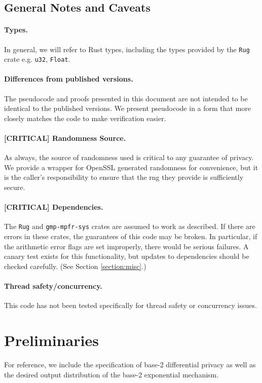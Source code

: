\documentclass[11pt]{article}
\theoremstyle{definition}
\newcommand{\unsigned}[1]{{\tt u#1}}
\begin{document}
\subsection{General Notes and Caveats}
\paragraph{Types.} In general, we will refer to Rust types, including the types provided by the {\tt Rug} crate e.g. \unsigned{32}, {\tt Float}.

\paragraph{Differences from published versions.} The pseudocode and proofs presented in this document are not intended to be identical to the published versions. We present pseudocode in a form that more closely matches the code to make verification easier.

\paragraph{[CRITICAL] Randomness Source.} As always, the source of randomness used is critical to any guarantee of privacy. We provide a wrapper for OpenSSL generated randomness for convenience, but it is the caller's responsibility to ensure that the rng they provide is sufficiently secure. 

\paragraph{[CRITICAL] Dependencies.} The {\tt Rug} and {\tt gmp-mpfr-sys} crates are assumed to work as described. If there are errors in these crates, the guarantees of this code may be broken. In particular, if the arithmetic error flags are set improperly, there would be serious failures. A canary test exists for this functionality, but updates to dependencies should be checked carefully. (See Section \ref{section:misc}.)

\paragraph{Thread safety/concurrency.} This code has not been tested specifically for thread safety or concurrency issues.

\section{Preliminaries}\label{section:preliminaries}
For reference, we include the specification of  base-2 differential privacy as well as the desired output distribution of the base-2 exponential mechanism.
\end{document}
